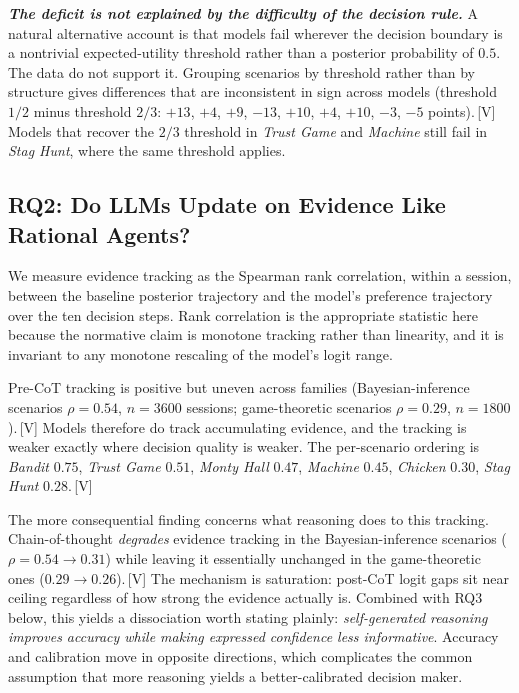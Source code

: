 \textbf{\textit{The deficit is not explained by the difficulty of the decision
rule.}}
A natural alternative account is that models fail wherever the decision
boundary is a nontrivial expected-utility threshold rather than a posterior
probability of $0.5$. The data do not support it. Grouping scenarios by
threshold rather than by structure gives differences that are inconsistent in
sign across models (threshold $1/2$ minus threshold $2/3$: $+13$, $+4$, $+9$,
$-13$, $+10$, $+4$, $+10$, $-3$, $-5$ points).\,[V] Models that recover the
$2/3$ threshold in \textit{Trust Game} and \textit{Machine} still fail in
\textit{Stag Hunt}, where the same threshold applies.

\subsection{RQ2: Do LLMs Update on Evidence Like Rational Agents?}

We measure evidence tracking as the Spearman rank correlation, within a
session, between the baseline posterior trajectory and the model's preference
trajectory over the ten decision steps. Rank correlation is the appropriate
statistic here because the normative claim is monotone tracking rather than
linearity, and it is invariant to any monotone rescaling of the model's logit
range.

Pre-CoT tracking is positive but uneven across families (Bayesian-inference
scenarios $\rho=0.54$, $n=3600$ sessions; game-theoretic scenarios
$\rho=0.29$, $n=1800$).\,[V] Models therefore do track accumulating evidence,
and the tracking is weaker exactly where decision quality is weaker. The
per-scenario ordering is \textit{Bandit} $0.75$, \textit{Trust Game} $0.51$,
\textit{Monty Hall} $0.47$, \textit{Machine} $0.45$, \textit{Chicken} $0.30$,
\textit{Stag Hunt} $0.28$.\,[V]

The more consequential finding concerns what reasoning does to this tracking.
Chain-of-thought \emph{degrades} evidence tracking in the Bayesian-inference
scenarios ($\rho=0.54\rightarrow0.31$) while leaving it essentially unchanged
in the game-theoretic ones ($0.29\rightarrow0.26$).\,[V] The mechanism is
saturation: post-CoT logit gaps sit near ceiling regardless of how strong the
evidence actually is. Combined with RQ3 below, this yields a dissociation worth
stating plainly: \emph{self-generated reasoning improves accuracy while making
expressed confidence less informative}. Accuracy and calibration move in
opposite directions, which complicates the common assumption that more
reasoning yields a better-calibrated decision maker.

